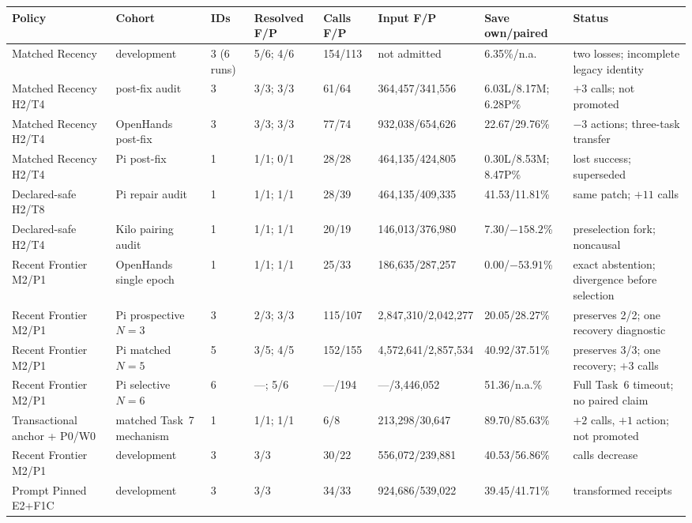 \documentclass[11pt]{article}
\begin{document}
\begin{table}[H]
\centering
\scriptsize
\setlength{\tabcolsep}{3pt}
\begin{tabularx}{\linewidth}{p{.145\linewidth}p{.095\linewidth}p{.08\linewidth}p{.10\linewidth}p{.09\linewidth}p{.15\linewidth}p{.115\linewidth}Y}
\toprule
Policy & Cohort & IDs & Resolved F/P & Calls F/P & Input F/P & Save own/paired & Status \\
\midrule
Matched Recency & development & 3 (6 runs) & 5/6; 4/6 & 154/113 & not admitted & 6.35\%/n.a. & two losses; incomplete legacy identity \\
Matched Recency H2/T4 & post-fix audit & 3 & 3/3; 3/3 & 61/64 & 364,457/341,556 & 6.03L/8.17M; 6.28P\% & $+3$ calls; not promoted \\
Matched Recency H2/T4 & OpenHands post-fix & 3 & 3/3; 3/3 & 77/74 & 932,038/654,626 & 22.67/29.76\% & $-3$ actions; three-task transfer \\
Matched Recency H2/T4 & Pi post-fix & 1 & 1/1; 0/1 & 28/28 & 464,135/424,805 & 0.30L/8.53M; 8.47P\% & lost success; superseded \\
Declared-safe H2/T8 & Pi repair audit & 1 & 1/1; 1/1 & 28/39 & 464,135/409,335 & 41.53/11.81\% & same patch; $+11$ calls \\
Declared-safe H2/T4 & Kilo pairing audit & 1 & 1/1; 1/1 & 20/19 & 146,013/376,980 & 7.30/$-158.2$\% & preselection fork; noncausal \\
Recent Frontier M2/P1 & OpenHands single epoch & 1 & 1/1; 1/1 & 25/33 & 186,635/287,257 & 0.00/$-53.91$\% & exact abstention; divergence before selection \\
Recent Frontier M2/P1 & Pi prospective $N=3$ & 3 & 2/3; 3/3 & 115/107 & 2,847,310/2,042,277 & 20.05/28.27\% & preserves 2/2; one recovery diagnostic \\
Recent Frontier M2/P1 & Pi matched $N=5$ & 5 & 3/5; 4/5 & 152/155 & 4,572,641/2,857,534 & 40.92/37.51\% & preserves 3/3; one recovery; $+3$ calls \\
Recent Frontier M2/P1 & Pi selective $N=6$ & 6 & ---; 5/6 & ---/194 & ---/3,446,052 & 51.36/n.a.\% & Full Task~6 timeout; no paired claim \\
Transactional anchor + P0/W0 & matched Task~7 mechanism & 1 & 1/1; 1/1 & 6/8 & 213,298/30,647 & 89.70/85.63\% & $+2$ calls, $+1$ action; not promoted \\
Recent Frontier M2/P1 & development & 3 & 3/3 & 30/22 & 556,072/239,881 & 40.53/56.86\% & calls decrease \\
Prompt Pinned E2+F1C & development & 3 & 3/3 & 34/33 & 924,686/539,022 & 39.45/41.71\% & transformed receipts \\

\end{tabularx}
\end{table}
\end{document}
